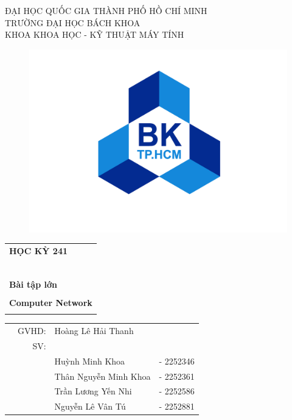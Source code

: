 \documentclass[a4paper]{article}
\begin{document}
\setlength{\parindent}{0.5cm}

\begin{titlepage}
\begin{center}
ĐẠI HỌC QUỐC GIA THÀNH PHỐ HỒ CHÍ MINH \\
TRƯỜNG ĐẠI HỌC BÁCH KHOA \\
KHOA KHOA HỌC - KỸ THUẬT MÁY TÍNH 
\end{center}

\begin{figure}[h!]
\begin{center}
\includegraphics[scale = 0.27]{01_logobachkhoasang.png}
\end{center}
\end{figure}


\begin{center}
\begin{tabular}{c}
	\multicolumn{1}{l}{\textbf{{\Large HỌC KỲ 241}}}\\
	~~\\
	\hline
	\\
	\multicolumn{1}{l}{\textbf{{\Large Bài tập lớn}}}\\
	\\
	
	\textbf{{\Huge Computer Network}}\\
	\\
	\hline
\end{tabular}
\end{center}

\begin{table}[h]
\begin{tabular}{rrll}
\hspace{2.5 cm} & GVHD: &  Hoàng Lê Hải Thanh\\
& SV: &  &\\
& &   Huỳnh Minh Khoa&- 2252346\\
& &Thân Nguyễn Minh Khoa &- 2252361\\
& & Trần Lương Yến Nhi &- 2252586\\
 & & Nguyễn Lê Vân Tú&- 2252881\\
\end{tabular}
\end{table}


\end{titlepage}
\end{document}
